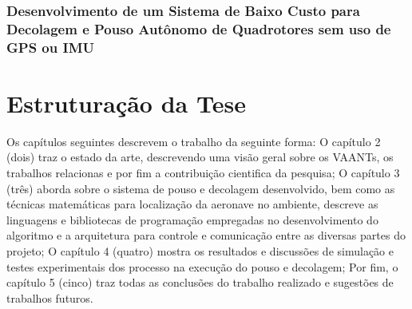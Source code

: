 	\subsubsection{Desenvolvimento de um Sistema de Baixo Custo para Decolagem e Pouso Autônomo de Quadrotores sem uso de GPS ou IMU}

\section{Estruturação da Tese}

Os capítulos seguintes descrevem o trabalho da seguinte forma: O capítulo 2 (dois) traz o estado da arte, descrevendo uma visão geral sobre os VAANTs, os trabalhos relacionas e por fim a contribuição cientifica da pesquisa; O capítulo 3 (três) aborda sobre o sistema de pouso e decolagem desenvolvido, bem como as técnicas matemáticas para localização da aeronave no ambiente, descreve as linguagens e bibliotecas de programação empregadas no desenvolvimento do algoritmo e a arquitetura para controle e comunicação entre as diversas partes do projeto; O capítulo 4 (quatro) mostra os resultados e discussões de simulação e testes experimentais dos processo na execução do pouso e decolagem; Por fim, o capítulo 5 (cinco) traz todas as conclusões do trabalho realizado e sugestões de trabalhos futuros.





